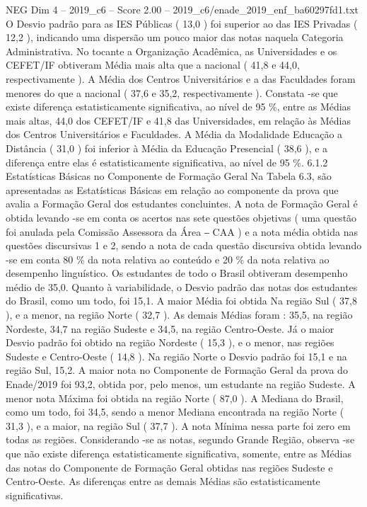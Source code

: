 \begin{textsample}{NEG Dim 4 – 2019\_c6 – Score 2.00 – 2019\_c6/enade\_2019\_enf\_ba60297fd1.txt}
O Desvio padrão para as IES Públicas ( 13,0 ) foi superior ao das IES Privadas ( 12,2 ), indicando uma dispersão um pouco maior das notas naquela Categoria Administrativa.
No tocante a Organização Acadêmica, as Universidades e os CEFET/IF obtiveram Média mais alta que a nacional ( 41,8 e 44,0, respectivamente ).
A Média dos Centros Universitários e a das Faculdades foram menores do que a nacional ( 37,6 e 35,2, respectivamente ).
Constata -se que existe diferença estatisticamente significativa, ao nível de 95 \%, entre as Médias mais altas, 44,0 dos CEFET/IF e 41,8 das Universidades, em relação às Médias dos Centros Universitários e Faculdades.
A Média da Modalidade Educação a Distância ( 31,0 ) foi inferior à Média da Educação Presencial ( 38,6 ), e a diferença entre elas é estatisticamente significativa, ao nível de 95 \%. 6.1.2 Estatísticas Básicas no Componente de Formação Geral Na Tabela 6.3, são apresentadas as Estatísticas Básicas em relação ao componente da prova que avalia a Formação Geral dos estudantes concluintes.
A nota de Formação Geral é obtida levando -se em conta os acertos nas sete questões objetivas ( uma questão foi anulada pela Comissão Assessora da Área ‒ CAA ) e a nota média obtida nas questões discursivas 1 e 2, sendo a nota de cada questão discursiva obtida levando -se em conta 80 \% da nota relativa ao conteúdo e 20 \% da nota relativa ao desempenho linguístico.
Os estudantes de todo o Brasil obtiveram desempenho médio de 35,0.
Quanto à variabilidade, o Desvio padrão das notas dos estudantes do Brasil, como um todo, foi 15,1.
A maior Média foi obtida Na região Sul ( 37,8 ), e a menor, na região Norte ( 32,7 ).
As demais Médias foram : 35,5, na região Nordeste, 34,7 na região Sudeste e 34,5, na região Centro-Oeste.
Já o maior Desvio padrão foi obtido na região Nordeste ( 15,3 ), e o menor, nas regiões Sudeste e Centro-Oeste ( 14,8 ).
Na região Norte o Desvio padrão foi 15,1 e na região Sul, 15,2.
A maior nota no Componente de Formação Geral da prova do Enade/2019 foi 93,2, obtida por, pelo menos, um estudante na região Sudeste.
A menor nota Máxima foi obtida na região Norte ( 87,0 ).
A Mediana do Brasil, como um todo, foi 34,5, sendo a menor Mediana encontrada na região Norte ( 31,3 ), e a maior, na região Sul ( 37,7 ).
A nota Mínima nessa parte foi zero em todas as regiões.
Considerando -se as notas, segundo Grande Região, observa -se que não existe diferença estatisticamente significativa, somente, entre as Médias das notas do Componente de Formação Geral obtidas nas regiões Sudeste e Centro-Oeste.
As diferenças entre as demais Médias são estatisticamente significativas.

\end{textsample}
